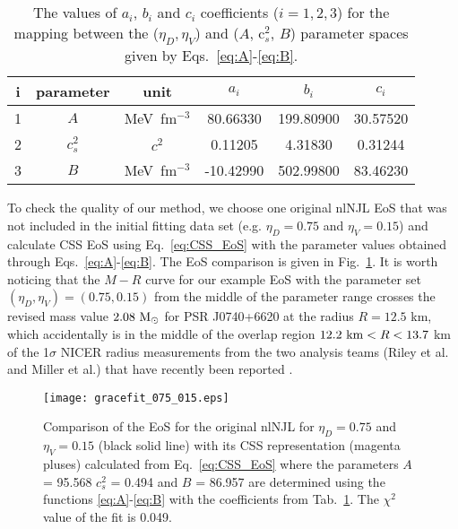 \documentclass[%
 reprint,
superscriptaddress,
nofootinbib,
 amsmath,amssymb,
 aps,
]{revtex4-1}
\begin{document}
\begin{table}[thb]
\caption{ The values of $a_i$, $b_i$ and $c_i$ coefficients ($i=1,2,3$) for 
the mapping between the ($\eta_D,\eta_V$) and ($A$, c$_s^2$, $B$) parameter spaces given by 
Eqs.~\eqref{eq:A}-\eqref{eq:B}.
}
\label{tab:Coefficients}
\begin{ruledtabular}
\begin{tabular}{cccccc}
i & parameter& unit &  $a_i$ & $b_i$ & $c_i$  \\
\hline
1 & $A$ & MeV\, fm$^{-3}$   & 80.66330 & 199.80900 & 30.57520 \\ 
2 & $c_s^2$ & $c^2$ & 0.11205 & 4.31830 & 0.31244  \\
3 & $B $ & MeV\, fm$^{-3}$   & -10.42990 & 502.99800 & 83.46230\\
\end{tabular}
\end{ruledtabular}
\end{table}

To check the quality of our method, we choose one original nlNJL EoS that was not included in the initial fitting data set (e.g. $\eta_D=0.75$ and $\eta_V=0.15$) and calculate CSS EoS using Eq.~\eqref{eq:CSS_EoS} with the parameter values obtained through Eqs.~\eqref{eq:A}-\eqref{eq:B}. The EoS comparison is given in Fig.~\ref{fig:075017}. It is worth noticing that the $M-R$ curve for our example EoS
with the parameter set $(\eta_D,\eta_V)=(0.75,0.15)$ from the middle of the parameter range crosses the revised mass value $2.08~\textmd{M}_\odot$ for PSR J0740+6620 \cite{fonseca2021refined} at the radius $R=12.5$ km, which accidentally is in the middle of the overlap region $12.2 {\rm ~km}< R <13.7$ km of the 1$\sigma$ NICER radius measurements from the two analysis teams (Riley et al. and Miller et al.) that have recently been reported \cite{NICERweb}.


\begin{figure}[t!]
    \centering
    \texttt{[image: gracefit\_075\_015.eps]}
    \caption{
    Comparison of the EoS for the original nlNJL for $\eta_D=0.75$ and $\eta_V=0.15$ (black solid line) 
    with its CSS representation (magenta pluses) calculated from
    Eq.~\eqref{eq:CSS_EoS} where the parameters $A$ = 95.568 $c_s^2$ = 0.494 and  $B$ = 86.957
    are determined using the functions \eqref{eq:A}-\eqref{eq:B} with the coefficients from Tab.~\ref{tab:Coefficients}.
    The $\chi^2$ value of the fit is 0.049.
    }
    \label{fig:075017}
\end{figure}
\end{document}
